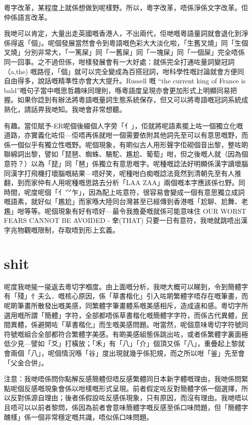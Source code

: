 粵字改革，某程度上就係想做到呢樣野。所以，粵字改革，唔係淨係文字改革。佢仲係語言改革。



我哋可以肯定，大量出走英國嘅香港人，不出兩代，佢哋嘅粵語量詞就會退化到淨係得返「個」。呢個發展當然會令到粵語嘅色彩大大淡化啦，「生舊叉燒」同「生個叉燒」分別非常大，「一篤屎」同「一舊屎」同「一塊屎」同「一個屎」完全唔係同一回事。之不過但係，咁樣發展會有一大好處：就係完全打通咗量詞變冠詞（a,the) 嘅路徑，「個」就可以完全變成為百搭冠詞，咁科學性嘅討論就會方便同自由得多，說話嘅精準性亦會大大提升。Russell 嘅 “the current king of France is bald”嘅句子當中嘅思哲趣味同理則，喺粵語度呈現亦會更加形式上明顯同易把握。如果你諗到有辦法將粵語嘅量詞生態系統保存，但又可以將粵語嘅冠詞系統成熟化，請話畀我哋知。我哋會非常想聽。



有趣。當佢賦予-ER呢個後綴個人字旁「亻」，佢就將呢語素擺上咗一個獨立化嘅道路，亦實義化咗佢—佢唔再係就咁一個需要依附其他詞先至可以有意思嘅野，而係一個似乎有獨立性嘅野。呢個現象，有啲似古人用形聲字佢砌個音出黎，整咗啲聯綿詞出黎，譬如「琵琶、蜘蛛、駱駝、尷尬、葡萄」咁，但之後嘅人就（因為個意符？）以為「琵」同「琶」係獨立有意思嘅字。呢種嘅諗法好明顯係漢字讀壞腦同漢字打飛機打壞腦嘅結果—唔好笑，呢種咁白痴嘅諗法竟然到清朝先至有人推翻，到而家仲有人用呢種嘅思路去分析「LAA ZAA」兩個嘅本字應該係乜野。同時間，呢度呢個「亻⺍乍」，因為配上咗意符，很容易會變成一個有意思獨立成詞嘅語素，就好似「尷尬」而家喺大陸同台灣甚至已經傳到香港嘅「尬聊、尬舞、老尷」咁等等。呢個現象有好有唔好—最令我擔憂嘅就係可能意味住 OUR WORST FEARS CANNOT BE AVOIDED - 羍(THAT) 只要一日有意符，我哋就跳唔出漢字兆物觀嘅限制，存取唔到形上玄義。


\section{shit}

呢度我哋㨢一㨢返去粵切字嗰度。由上面嘅分析，我哋大概可以睇到，令到簡體字有「殘」忄夫么．嘅核心原因，係「草書楷化」引入咗啲繁體字唔存在嘅筆畫，而呢啲筆畫所散發出嘅美感，同繁體字筆畫體系嘅美感相斥，造成違和感。粵切字所選用嘅所謂「簡體」字符，全部都唔係草書楷化嘅簡體字字符，而係古代異體，民間異體，係避開咗「草書楷化」而生嘅美感問題。咁當然，呢個意味粵切字符號同符號嘅組合全部都符合繁體字美感。有啲美感組態係跳出咗，或者係繁體字裏面極低少見—譬如「爻」打橫放；「禾」有「八」「介」個頂又係「八」，重疊起上黎就會兩個「八」，呢個情況喺「谷」度出現就幾乎係犯規，而之所以咁「釜」先至會「父金合併」。


注意：我哋唔係問你點解反感簡體但唔反感繁體同日本新字體嘅理由，我哋係問緊點呢個反感嘅現象會係以咁樣嘅形式呈現。前者假定咗反對簡體字係一個選擇，所以反對係源自理由；後者係假設咗反感係現象，只有原因，而沒有理由。我哋唔以且唔可以以前者黎問，係因為前者會意味簡體字嘅反感至係口味問題，但「簡體字醜樣」係一個非常穩定嘅共識，唔似係口味問題。

